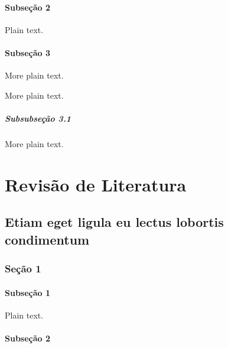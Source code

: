 \documentclass[12pt,openright,twoside,a4paper]{abntex2}
\begin{document}
\lipsum[8-10]

\subsection{Subseção 2}

Plain text.

\lipsum[11-15]

\subsection{Subseção 3}

More plain text.

\lipsum[16-20]

More plain text.

\subsubsection{Subsubseção 3.1}

More plain text.

\lipsum[21-25]


\part{Revisão de Literatura}


\chapter{Etiam eget ligula eu lectus lobortis condimentum}

\lipsum[1-3]

\section{Seção 1}

\lipsum[4-5]

\subsection{Subseção 1}

Plain text.

\lipsum[6-10]

\subsection{Subseção 2}
\end{document}

